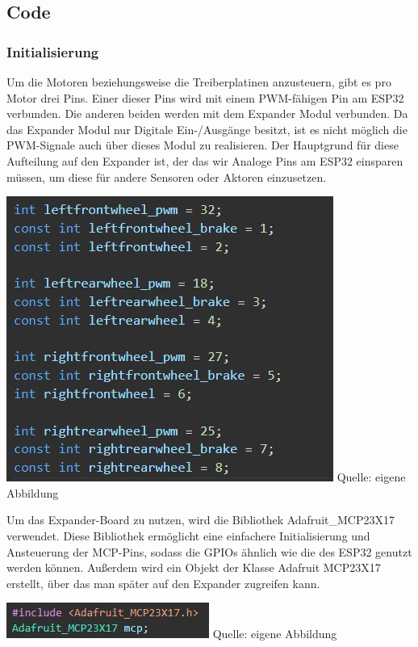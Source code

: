 \documentclass[ngerman,12pt,a4paper]{article}
\begin{document}
		\subsection{Code} 
		\subsubsection{Initialisierung}
		Um die Motoren beziehungsweise die Treiberplatinen anzusteuern, gibt es pro Motor drei Pins. Einer dieser Pins wird mit einem PWM-fähigen Pin am ESP32 verbunden. Die anderen beiden werden mit dem Expander Modul verbunden. Da das Expander Modul nur Digitale Ein-/Ausgänge besitzt, ist es nicht möglich die PWM-Signale auch über dieses Modul zu realisieren. Der Hauptgrund für diese Aufteilung auf den Expander ist, der das wir Analoge Pins am ESP32 einsparen müssen, um diese für andere Sensoren oder Aktoren einzusetzen. \\[0.5cm]
		\begin{minipage}{\textwidth}
			\centering
			\includegraphics[scale=1.05]{Pictures/code_pins_motoren}
			\label{fig:code_pins_motoren}
			\vspace{-2pt}
			\small Quelle: eigene Abbildung
			\vspace{20pt}
		\end{minipage}
		Um das Expander-Board zu nutzen, wird die Bibliothek Adafruit\_MCP23X17 verwendet. Diese Bibliothek ermöglicht eine einfachere Initialisierung und Ansteuerung der MCP-Pins, sodass die GPIOs ähnlich wie die des ESP32 genutzt werden können. Außerdem wird ein Objekt der Klasse Adafruit MCP23X17 erstellt, über das man später auf den Expander zugreifen kann. \\[0.5cm]
		\begin{minipage}{\textwidth}
			\centering
			\includegraphics[scale=1.3]{Pictures/code_libary_motoren}
			\label{fig:code_libary_motoren}
			\vspace{-2pt}
			\small Quelle: eigene Abbildung
		\end{minipage}	
		\newpage
\end{document}
